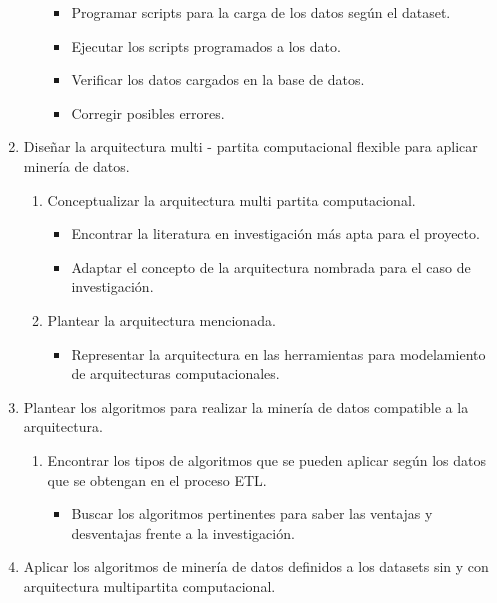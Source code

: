\documentclass[a4paper, 11pt, oneside]{article}
\theoremstyle{definition}
\theoremstyle{remark}
\begin{document}
\begin{enumerate}
\begin{enumerate}
      \begin{itemize}
        \item Programar scripts para la carga de los datos              según el dataset.
        \item Ejecutar los scripts programados a los dato.
        \item Verificar los datos cargados en la base de               datos.
        \item Corregir posibles errores.
      \end{itemize}
  \end{enumerate}
   \item Diseñar la arquitectura multi - partita computacional     flexible para aplicar minería de datos.
   \begin{enumerate}
      \item Conceptualizar la arquitectura multi partita computacional.
      \begin{itemize}
        \item Encontrar la literatura en investigación más             apta para el proyecto.
        \item Adaptar el concepto de la arquitectura nombrada         para el caso de investigación.
      \end{itemize}
      \item Plantear la arquitectura mencionada.
      \begin{itemize}
        \item Representar la arquitectura en las herramientas         para modelamiento de arquitecturas computacionales.
      \end{itemize}
  \end{enumerate}
  \item Plantear los algoritmos para realizar la minería de datos compatible a la arquitectura.
    \begin{enumerate}
      \item Encontrar  los tipos de algoritmos que se pueden aplicar según los datos que se obtengan en el proceso ETL.
      \begin{itemize}
        \item Buscar los algoritmos pertinentes para saber las ventajas y desventajas frente a la investigación.
      \end{itemize}
  \end{enumerate}
 \item Aplicar los algoritmos de minería de datos definidos a los datasets sin y con arquitectura multipartita computacional.

\end{enumerate}
\end{document}
